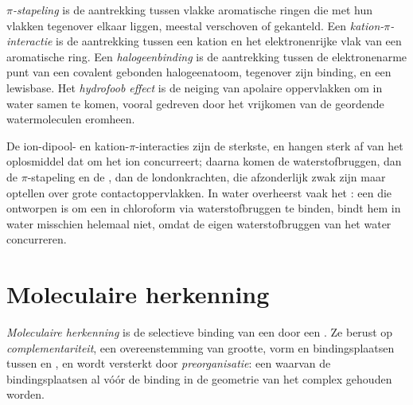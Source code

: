 \begin{definition}\label{def:b3:supramolecular:interactions}
\emph{$\pi$-stapeling} is de aantrekking tussen vlakke
aromatische ringen die met hun vlakken tegenover elkaar liggen, meestal
verschoven of gekanteld. Een
\emph{kation-$\pi$-interactie} is de
aantrekking tussen een kation en het elektronenrijke vlak van een
aromatische ring. Een \emph{halogeenbinding}
is de aantrekking tussen de elektronenarme punt van een covalent gebonden
halogeenatoom, tegenover zijn binding, en een lewisbase. Het
\emph{hydrofoob effect} is de neiging van apolaire
oppervlakken om in water samen te komen, vooral gedreven door het
vrijkomen van de geordende watermoleculen eromheen.
\end{definition}

De ion-dipool- en kation-$\pi$-interacties zijn de sterkste, en hangen sterk af
van het oplosmiddel dat om het ion concurreert; daarna komen de
waterstofbruggen, dan de $\pi$-stapeling en de , dan de
londonkrachten, die afzonderlijk zwak zijn maar optellen over grote
contactoppervlakken. In water overheerst vaak het : een
 die ontworpen is om een  in chloroform via waterstofbruggen
te binden, bindt hem in water misschien helemaal niet, omdat de eigen
waterstofbruggen van het water concurreren.

\section{Moleculaire herkenning}

\begin{definition}\label{def:b3:supramolecular:recognition}
\emph{Moleculaire herkenning} is de
selectieve binding van een  door een . Ze berust op
\emph{complementariteit}, een overeenstemming
van grootte, vorm en bindingsplaatsen tussen  en , en wordt
versterkt door \emph{preorganisatie}: een 
waarvan de bindingsplaatsen al vóór de binding in de geometrie van het
complex gehouden worden.
\end{definition}

